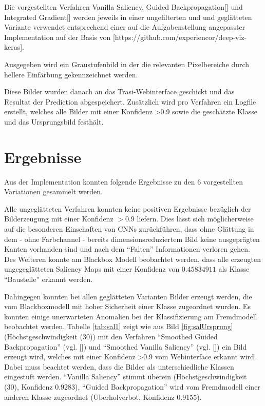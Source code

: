 Die vorgestellten Verfahren Vanilla Saliency\cite{simonyan_deep_2013}, Guided Backpropagation[] und Integrated Gradient[] werden jeweils in einer ungefilterten und und geglätteten Variante verwendet entsprechend einer auf die Aufgabenstellung angepasster Implementation auf der Basis von [https://github.com/experiencor/deep-viz-keras]. 

Ausgegeben wird ein Graustufenbild in der die relevanten Pixelbereiche durch hellere Einfärbung gekennzeichnet werden.

Diese Bilder wurden danach an das Trasi-Webinterface geschickt und das Resultat der Prediction abgespeichert. Zusätzlich wird pro Verfahren ein Logfile erstellt, welches alle Bilder mit einer Konfidenz >0.9 sowie die geschätzte Klasse und das Ursprungsbild festhält.
%
%
%
%


\section{Ergebnisse}

Aus der Implementation konnten folgende Ergebnisse zu den 6 vorgestellten Variationen gesammelt werden. 

Alle ungeglätteten Verfahren konnten keine positiven Ergebnisse bezüglich der Bilderzeugung mit einer Konfidenz $> 0.9$ liefern. Dies lässt sich möglicherweise auf die besonderen Einschaften von CNNs zurückführen, dass ohne Glättung in dem - ohne Farbchannel - bereits dimensionsreduziertem Bild keine ausgeprägten Kanten vorhanden sind und nach dem "`Falten"' Informationen verloren gehen. Des Weiteren konnte am Blackbox Modell beobachtet werden, dass alle erzeugten ungegeglätteten Saliency Maps mit einer Konfidenz von $0.45834911$ als Klasse "`Baustelle"' erkannt werden.

Dahingegen konnten bei allen geglätteten Varianten Bilder erzeugt werden, die vom Blackboxmodell mit hoher Sicherheit einer Klasse zugeordnet wurden. Es konnten einige unerwarteten Anomalien bei der Klassifizierung am Fremdmodell beobachtet werden.  Tabelle \ref{tab:sal1} zeigt wie aus Bild \ref{fig:salUrsprung} (Höchstgeschwindigkeit (30))  mit den Verfahren "`Smoothed Guided Backpropagation"' (vgl. []) und "`Smoothed Vanilla Saliency"' (vgl. []) ein Bild erzeugt wird, welches mit einer Konfidenz >0.9 vom Webinterface erkannt wird. Dabei muss beachtet werden, dass die Bilder als unterschiedliche Klassen eingestuft werden. "`Vanilla Saliency"' stimmt überein (Höchstgeschwindigkeit (30), Konfidenz 0.9283), "`Guided Backpropagation"' wird vom Fremdmodell einer anderen Klasse zugeordnet (Überholverbot, Konfidenz 0.9155).

